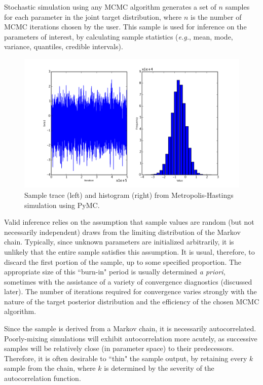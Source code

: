 \documentclass[]{book}
\begin{document}
Stochastic simulation using any MCMC algorithm generates a set of $n$ samples for each parameter in the joint target distribution, where $n$ is the number of MCMC iterations chosen by the user. This sample is used for inference on the parameters of interest, by calculating sample statistics (\emph{e.g.}, mean, mode, variance, quantiles, credible intervals). 

\begin{figure}[ht]
		\begin{center}
		\includegraphics[scale=0.4]{sample_output.png}
	\end{center}
	\caption{Sample trace (left) and histogram (right) from Metropolis-Hastings simulation using PyMC.}
	\label{fig:sample_output}
\end{figure}

Valid inference relies on the assumption that sample values are random (but not necessarily independent) draws from the limiting distribution of the Markov chain. Typically, since unknown parameters are initialized arbitrarily, it is unlikely that the entire sample satisfies this assumption. It is usual, therefore, to discard the first portion of the sample, up to some specified proportion. The appropriate size of this ``burn-in" period is usually determined  \emph{a priori}, sometimes with the assistance of a variety of convergence diagnostics (discussed later). The number of iterations required for convergence varies strongly with the nature of the target posterior distribution and the efficiency of the chosen MCMC algorithm. 

Since the sample is derived from a Markov chain, it is necessarily autocorrelated. Poorly-mixing simulations will exhibit autocorrelation more acutely, as successive samples will be relatively close (in parameter space) to their predecessors. Therefore, it is often desirable to ``thin" the sample output, by retaining every $k$ sample from the chain, where $k$ is determined by the severity of the autocorrelation function.
\end{document}
